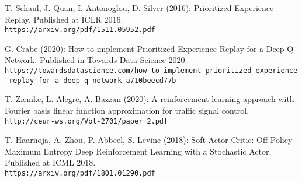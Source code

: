 \documentclass[a4paper,11pt]{article}
\theoremstyle{definition}
\begin{document}
\begin{thebibliography}{4}

T. Schaul, J. Quan, I. Antonoglou, D. Silver (2016): Prioritized Experience Replay. Published at ICLR 2016.\\
\texttt{https://arxiv.org/pdf/1511.05952.pdf}

G. Crabe (2020): 
How to implement Prioritized Experience Replay for a Deep Q-Network. Published in Towards Data Science 2020.\\
\texttt{https://towardsdatascience.com/how-to-implement-prioritized-experience\\-replay-for-a-deep-q-network-a710beecd77b}

T. Ziemke, L. Alegre, A. Bazzan (2020): A reinforcement learning approach with Fourier basis linear function approximation for traffic signal control. \\
\texttt{http://ceur-ws.org/Vol-2701/paper\_2.pdf}

T. Haarnoja, A. Zhou, P. Abbeel, S. Levine (2018): Soft Actor-Critic: Off-Policy Maximum Entropy Deep Reinforcement Learning with a Stochastic Actor. Published at ICML 2018.\\
\texttt{https://arxiv.org/pdf/1801.01290.pdf}


\end{thebibliography}
\end{document}
